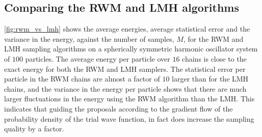 \FloatBarrier

\subsection{Comparing the RWM and LMH algorithms}

\autoref{fig:rwm_vs_lmh} shows the average energies, average statistical error and the variance in the energy, against the number of samples, $M$, for the RWM and LMH sampling algorithms on a spherically symmetric harmonic oscillator system of $100$ particles. The average energy per particle over $16$ chains is close to the exact energy for both the RWM and LMH samplers. The statistical error per particle in the RWM chains are almost a factor of $10$ larger than for the LMH chains, and the variance in the energy per particle shows that there are much larger fluctuations in the energy using the RWM algorithm than the LMH. This indicates that guiding the proposals according to the gradient flow of the probability density of the trial wave function, in fact does increase the sampling quality by a factor. 


